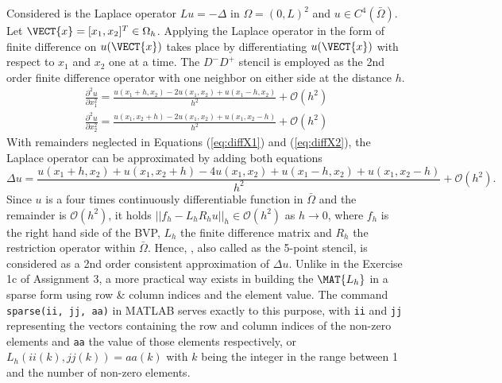 \newcommand{\assignmentDate}{November 18th, 2019}



Considered is the Laplace operator $Lu = -\Delta$ in $\Omega = (0, L)^2$ and $u \in C^4(\bar{\Omega})$.
%
\newcommand{\bigO}[1]{\mathcal{O}(#1)}
\newcommand{\fixDot}{\;\cdot\;}
Let $\VECT{x} = [x_1, x_2]^T \in \Omega_h$.
Applying the Laplace operator in the form of finite difference on $u(\VECT{x})$ takes place by differentiating $u(\VECT{x})$ with respect to $x_1$ and $x_2$ one at a time.
The $D^-D^+$ stencil is employed as the 2nd order finite difference operator with one neighbor on either side at the distance $h$.
\begin{align}
	\label{eq:diffX1}
	\frac{\partial^2u}{\partial x_1 ^2} = \frac{u(x_1 + h, x_2) - 2u(x_1, x_2) + u(x_1 - h, x_2)}{h^2} + \bigO{h^2}\\
	\label{eq:diffX2}
	\frac{\partial^2u}{\partial x_2 ^2} = \frac{u(x_1, x_2 + h) - 2u(x_1, x_2) + u(x_1, x_2 - h)}{h^2} + \bigO{h^2}
\end{align}
With remainders neglected in Equations (\ref{eq:diffX1}) and (\ref{eq:diffX2}), the Laplace operator can be approximated by adding both equations
\begin{equation}
	\label{eq:deltaU}
	\Delta u = \frac{u(x_1 + h, x_2) + u(x_1, x_2 + h) - 4u(x_1, x_2) + u(x_1 - h, x_2) + u(x_1, x_2 - h)}{h^2} + \bigO{h^2} \text{.}
 \end{equation}
Since $u$ is a four times continuously differentiable function in $\bar{\Omega}$ and the remainder is $\bigO{h^2}$, it holds $|| f_h -L_h R_h u||_{h} \in \bigO{h^2}$ as $h\rightarrow 0$, where $f_h$ is the right hand side of the BVP, $L_h$ the finite difference matrix and $R_h$ the restriction operator within $\bar{\Omega}$.
Hence, , also called as the 5-point stencil, is considered as a 2nd order consistent approximation of $\Delta u$.
%
Unlike in the Exercise 1c of Assignment 3, a more practical way exists in building the $\MAT{L_h}$ in a sparse form using row \& column indices and the element value.
The command \texttt{sparse(ii, jj, aa)} in MATLAB serves exactly to this purpose, with \texttt{ii} and \texttt{jj} representing the vectors containing the row and column indices of the non-zero elements and \texttt{aa} the value of those elements respectively, or $L_h(ii(k),jj(k)) = aa(k)$ with $k$ being the integer in the range between 1 and the number of non-zero elements.
